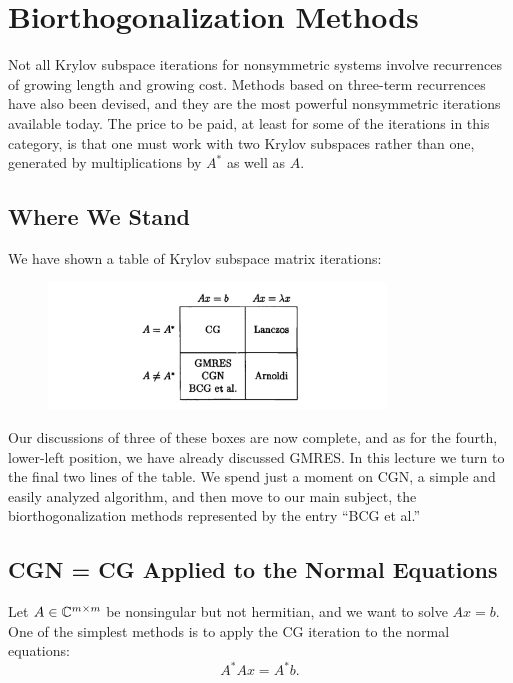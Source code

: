 \chapter{Biorthogonalization Methods}

Not all Krylov subspace iterations for nonsymmetric systems involve recurrences of growing length and growing cost. Methods based on three-term recurrences have also been devised, and they are the most powerful nonsymmetric iterations available today. The price to be paid, at least for some of the iterations in this category, is that one must work with two Krylov subspaces rather than one, generated by multiplications by $A^*$ as well as $A$.  

\section{Where We Stand} 
We have shown a table of Krylov subspace matrix iterations: 
\begin{figure}[H]
    \centering
    \includegraphics[width=0.8\textwidth]{figures/39-1.png}
\end{figure}
Our discussions of three of these boxes are now complete, and as for the fourth, lower-left position, we have already discussed GMRES. In this lecture we turn to the final two lines of the table. We spend just a moment on CGN, a simple and easily analyzed algorithm, and then move to our main subject, the biorthogonalization methods represented by the entry ``BCG et al.'' 

\section{CGN = CG Applied to the Normal Equations} 
Let $ A \in \mathbb{C}^{ m\times m }  $ be nonsingular but not hermitian, and we want to solve $ Ax=b $. One of the simplest methods is to apply the CG iteration to the normal equations: 
\begin{equation}
\label{eq: CGN normal equations}
    A^* A x = A^* b.    
\end{equation}

